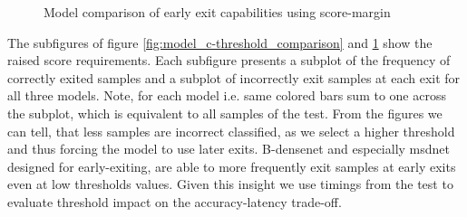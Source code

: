 \begin{minipage}{\linewidth}
\begin{figure}
		\hfill
		\hfill
		\hfill
		\hfill
		
		\caption[Model comparison of early exit capabilities]{Model comparison of early exit capabilities using score-margin}
		\label{fig:model_threshold_comparison}
	\end{figure}
	
\end{minipage}

The subfigures of figure \ref{fig:model_c-threshold_comparison} and \ref{fig:model_threshold_comparison} show the raised score requirements. Each subfigure presents a subplot of the frequency of correctly exited samples and a subplot of incorrectly exit samples at each exit for all three models. Note, for each model i.e. same colored bars sum to one across the subplot, which is equivalent to all samples of the test. From the figures we can tell, that less samples are incorrect classified, as we select a higher threshold and thus forcing the model to use later exits. B-\gls{densenet} and especially \gls{msdnet} designed for early-exiting, are able to more frequently exit samples at early exits even at low thresholds values. Given this insight we use timings from the test to evaluate threshold impact on the accuracy-latency trade-off.

